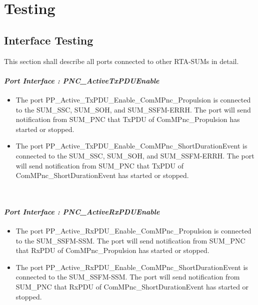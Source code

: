 \chapter{Testing}
\label{sec:Testing}
\section{Interface Testing}
\label{sec:InterfaceTestingSec}
This section shall describe all ports connected to other RTA-SUMs in detail.
\\
\subsubsection{\textit{Port Interface : PNC_ActiveTxPDUEnable}}

\begin{itemize}
	\item The port PP_Active_TxPDU_Enable_ComMPnc_Propulsion is connected to the SUM_SSC, SUM_SOH, and SUM_SSFM-ERRH. The port will send
    notification from SUM_PNC that TxPDU of ComMPnc_Propulsion has started or stopped.
\end{itemize}

\begin{itemize}
	\item The port PP_Active_TxPDU_Enable_ComMPnc_ShortDurationEvent is connected to the SUM_SSC, SUM_SOH, and SUM_SSFM-ERRH. The port will send
    notification from SUM_PNC that TxPDU of ComMPnc_ShortDurationEvent has started or stopped.
\end{itemize}
\\
\subsubsection{\textit{Port Interface : PNC_ActiveRxPDUEnable}}

\begin{itemize}
	\item The port PP_Active_RxPDU_Enable_ComMPnc_Propulsion is connected to the SUM_SSFM-SSM. The port will send
    notification from SUM_PNC that RxPDU of ComMPnc_Propulsion has started or stopped.
\end{itemize}

\begin{itemize}
	\item The port PP_Active_RxPDU_Enable_ComMPnc_ShortDurationEvent is connected to the SUM_SSFM-SSM. The port will send
    notification from SUM_PNC that RxPDU of ComMPnc_ShortDurationEvent has started or stopped.
\end{itemize}
\\
\\
